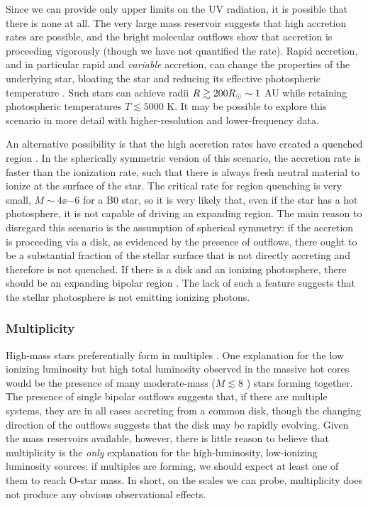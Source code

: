 \documentclass{emulateapj}
\begin{document}
Since we can provide only upper limits on the UV radiation, it is possible that
there is none at all.  The very large mass reservoir suggests that high
accretion rates are possible, and the bright molecular outflows show that
accretion is proceeding vigorously (though we have not quantified the rate).
Rapid accretion, and in particular rapid and \emph{variable} accretion, can
change the properties of the underlying star, bloating the star and reducing
its effective photospheric temperature \citep{Hosokawa2009a, Smith2012h,
Hosokawa2016a}.  Such stars can achieve radii $R\gtrsim200 R_{\odot} \sim 1$ AU
while retaining photospheric temperatures $T\lesssim5000$ K.  It may be
possible to explore this scenario in more detail with higher-resolution and
lower-frequency data.

An alternative possibility is that the high accretion rates have created
a quenched \hii region \citep{Walmsley1995b,Osorio1999a,Keto2006a}.
In the spherically symmetric version of this scenario, the accretion rate
is faster than the ionization rate, such that there is always fresh neutral
material to ionize at the surface of the star.  The critical rate for
\hii region quenching is very small, $\dot{M} \sim 4\ee{-6}$ \msun \peryr
for a B0 star, so it is very likely that, even if the star has a hot
photosphere, it is not capable of driving an expanding \hii region.
The main reason to disregard this scenario is the assumption of spherical
symmetry: if the accretion is proceeding via a disk, as evidenced by the
presence of outflows, there ought to be a substantial fraction of the stellar
surface that is not directly accreting and therefore is not quenched.  If there
is a disk and an ionizing photosphere, there should be an expanding bipolar
\hii region \citep{Keto2006a}.  The lack of such a feature suggests that the
stellar photosphere is not emitting ionizing photons.

\subsubsection{Multiplicity}
High-mass stars preferentially form in multiples \citep{Zinnecker2007a}.  One
explanation for the low ionizing luminosity but high total luminosity observed
in the massive hot cores would be the presence of many moderate-mass
($M\lesssim8$ \msun) stars forming together.  The presence of single bipolar
outflows suggests that, if there are multiple systems, they are in all cases
accreting from a common disk, though the changing direction of the outflows
suggests that the disk may be rapidly evolving.  Given the mass reservoirs
available, however, there is little reason to believe that multiplicity is the
\emph{only} explanation for the high-luminosity, low-ionizing luminosity
sources: if multiples are forming, we should expect at least one of them to
reach O-star mass.  In short, on the scales we can probe, multiplicity does not
produce any obvious observational effects.
\end{document}
